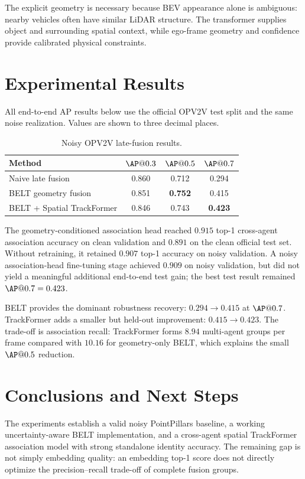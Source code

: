 \documentclass[11pt]{article}
\begin{document}
The explicit geometry is necessary because BEV appearance alone is ambiguous:
nearby vehicles often have similar LiDAR structure. The transformer supplies
object and surrounding spatial context, while ego-frame geometry and
confidence provide calibrated physical constraints.

\section{Experimental Results}

All end-to-end AP results below use the official OPV2V test split and the
same noise realization. Values are shown to three decimal places.

\begin{table}[h]
\centering
\caption{Noisy OPV2V late-fusion results.}
\label{tab:ap}
\begin{tabular}{lccc}
\toprule
Method & $\AP@0.3$ & $\AP@0.5$ & $\AP@0.7$ \\
\midrule
Naive late fusion & 0.860 & 0.712 & 0.294 \\
BELT geometry fusion & 0.851 & \textbf{0.752} & 0.415 \\
BELT + Spatial TrackFormer & 0.846 & 0.743 & \textbf{0.423} \\
\bottomrule
\end{tabular}
\end{table}

The geometry-conditioned association head reached $0.915$ top-1 cross-agent
association accuracy on clean validation and $0.891$ on the clean official
test set. Without retraining, it retained $0.907$ top-1 accuracy on noisy
validation. A noisy association-head fine-tuning stage achieved $0.909$ on
noisy validation, but did not yield a meaningful additional end-to-end test
gain; the best test result remained $\AP@0.7=0.423$.

BELT provides the dominant robustness recovery: $0.294\rightarrow0.415$ at
$\AP@0.7$. TrackFormer adds a smaller but held-out improvement:
$0.415\rightarrow0.423$. The trade-off is association recall: TrackFormer
forms $8.94$ multi-agent groups per frame compared with $10.16$ for
geometry-only BELT, which explains the small $\AP@0.5$ reduction.

\section{Conclusions and Next Steps}

The experiments establish a valid noisy PointPillars baseline, a working
uncertainty-aware BELT implementation, and a cross-agent spatial TrackFormer
association model with strong standalone identity accuracy. The remaining gap
is not simply embedding quality: an embedding top-1 score does not directly
optimize the precision--recall trade-off of complete fusion groups.
\end{document}
